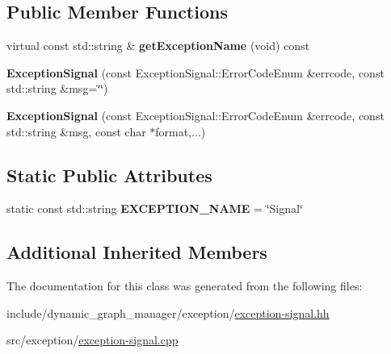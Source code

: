 \subsection*{Public Member Functions}
\begin{DoxyCompactItemize}
\item 
virtual const std\+::string \& {\bfseries get\+Exception\+Name} (void) const \hypertarget{classdynamic__graph_1_1ExceptionSignal_ad9503d0b270c9a992f8f7798ef4d62d1}{}\label{classdynamic__graph_1_1ExceptionSignal_ad9503d0b270c9a992f8f7798ef4d62d1}

\item 
{\bfseries Exception\+Signal} (const Exception\+Signal\+::\+Error\+Code\+Enum \&errcode, const std\+::string \&msg=\char`\"{}\char`\"{})\hypertarget{classdynamic__graph_1_1ExceptionSignal_aad0d2b0f022ca8bfc8ce3a9e81475d52}{}\label{classdynamic__graph_1_1ExceptionSignal_aad0d2b0f022ca8bfc8ce3a9e81475d52}

\item 
{\bfseries Exception\+Signal} (const Exception\+Signal\+::\+Error\+Code\+Enum \&errcode, const std\+::string \&msg, const char $\ast$format,...)\hypertarget{classdynamic__graph_1_1ExceptionSignal_a8b317aa83e16632ce3ce6e6c833acb91}{}\label{classdynamic__graph_1_1ExceptionSignal_a8b317aa83e16632ce3ce6e6c833acb91}

\end{DoxyCompactItemize}
\subsection*{Static Public Attributes}
\begin{DoxyCompactItemize}
\item 
static const std\+::string {\bfseries E\+X\+C\+E\+P\+T\+I\+O\+N\+\_\+\+N\+A\+ME} = \char`\"{}Signal\char`\"{}\hypertarget{classdynamic__graph_1_1ExceptionSignal_a3f08eaf0b6f59dffaa47e844387e978b}{}\label{classdynamic__graph_1_1ExceptionSignal_a3f08eaf0b6f59dffaa47e844387e978b}

\end{DoxyCompactItemize}
\subsection*{Additional Inherited Members}


The documentation for this class was generated from the following files\+:\begin{DoxyCompactItemize}
\item 
include/dynamic\+\_\+graph\+\_\+manager/exception/\hyperlink{exception-signal_8hh}{exception-\/signal.\+hh}\item 
src/exception/\hyperlink{exception-signal_8cpp}{exception-\/signal.\+cpp}\end{DoxyCompactItemize}
